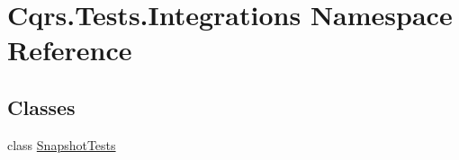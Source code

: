 \hypertarget{namespaceCqrs_1_1Tests_1_1Integrations}{}\section{Cqrs.\+Tests.\+Integrations Namespace Reference}
\label{namespaceCqrs_1_1Tests_1_1Integrations}
\subsection*{Classes}
\begin{DoxyCompactItemize}
\item 
class \hyperlink{classCqrs_1_1Tests_1_1Integrations_1_1SnapshotTests}{Snapshot\+Tests}
\end{DoxyCompactItemize}
